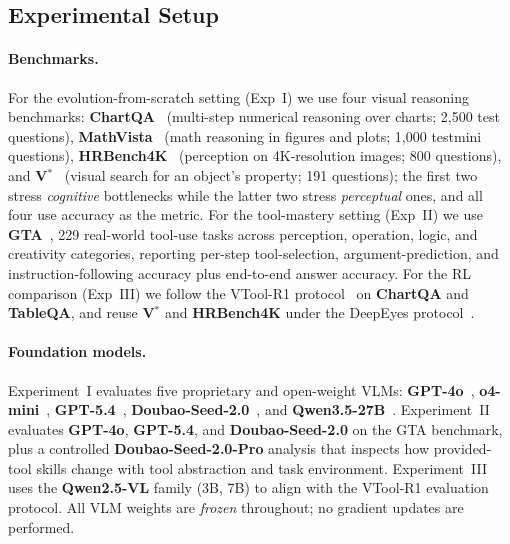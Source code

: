 \label{sec:experiments}

\subsection{Experimental Setup}
\label{sec:setup}

\paragraph{Benchmarks.}
For the evolution-from-scratch setting (Exp~I) we use four visual reasoning benchmarks:
\textbf{ChartQA}~\citep{DBLP:conf/acl/MasryLTJH22} (multi-step numerical reasoning over
charts; 2{,}500 test questions),
\textbf{MathVista}~\citep{DBLP:conf/iclr/LuBX0LH0CG024} (math reasoning in figures and
plots; 1{,}000 testmini questions),
\textbf{HRBench4K}~\citep{DBLP:conf/aaai/Wang0ZZ000T25} (perception on 4K-resolution
images; 800 questions), and
\textbf{V$^*$}~\citep{DBLP:conf/cvpr/WuX24a} (visual search for an object's property;
191 questions); the first two stress \emph{cognitive} bottlenecks while the latter two
stress \emph{perceptual} ones, and all four use accuracy as the metric.
For the tool-mastery setting (Exp~II) we use \textbf{GTA}~\citep{DBLP:conf/nips/WangMLZC0L24},
229 real-world tool-use tasks across perception, operation, logic, and creativity
categories, reporting per-step tool-selection, argument-prediction, and
instruction-following accuracy plus end-to-end answer accuracy.
For the RL comparison (Exp~III) we follow the VTool-R1
protocol~\citep{DBLP:journals/corr/abs-2505-19255} on \textbf{ChartQA} and
\textbf{TableQA}, and reuse \textbf{V$^*$} and \textbf{HRBench4K} under the DeepEyes
protocol~\citep{DBLP:journals/corr/abs-2505-14362}.

\paragraph{Foundation models.}
Experiment~I evaluates five proprietary and open-weight VLMs:
\textbf{GPT-4o}~\cite{DBLP:journals/corr/abs-2410-21276}, \textbf{o4-mini}~\cite{openai2025o3o4mini}, \textbf{GPT-5.4}~\cite{openai2026gpt54thinking}, \textbf{Doubao-Seed-2.0}~\cite{bytedanceseed2026seed20}, and
\textbf{Qwen3.5-27B}~\cite{qwen35blog}.
Experiment~II evaluates \textbf{GPT-4o}, \textbf{GPT-5.4}, and \textbf{Doubao-Seed-2.0}
on the GTA benchmark, plus a controlled \textbf{Doubao-Seed-2.0-Pro} analysis that
inspects how provided-tool skills change with tool abstraction and task environment.
Experiment~III uses the \textbf{Qwen2.5-VL} family (3B, 7B) to align with the
VTool-R1 evaluation protocol. All VLM weights are \emph{frozen} throughout; no gradient
updates are performed.

